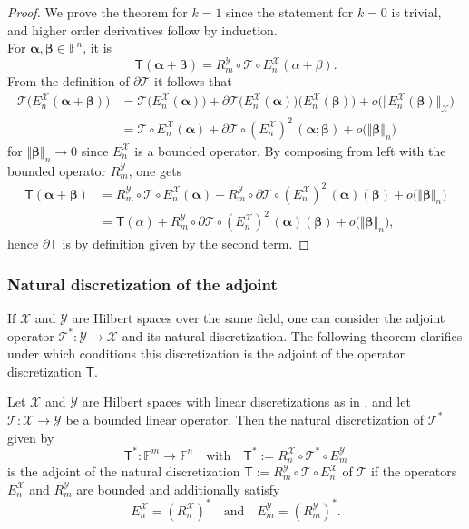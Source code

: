 \documentclass[a4paper]{paper}
\newcommand{\VecSpace}[1]{\mathscr{#1}}
\newcommand{\Field}{\mathbb{F}}
\newcommand{\Op}[1]{\mathcal{#1}}
\newcommand{\DiscOp}[1]{\mathsf{#1}}
\newcommand*{\EXT}[2]{\ensuremath{E_{#1}^{#2}}}
\newcommand*{\REST}[2]{\ensuremath{R_{#1}^{#2}}}
\newcommand*{\RnX}{\ensuremath{\REST{n}{\VecSpace{X}}}}
\newcommand*{\RmY}{\ensuremath{\REST{m}{\VecSpace{Y}}}}
\newcommand*{\EnX}{\ensuremath{\EXT{n}{\VecSpace{X}}}}
\newcommand*{\EmY}{\ensuremath{\EXT{m}{\VecSpace{Y}}}}
\newcommand{\valpha}{\boldsymbol{\alpha}}
\newcommand{\vbeta}{\boldsymbol{\beta}}
\begin{document}
\begin{proof}
 We prove the theorem for $k=1$ since the statement for $k=0$ is trivial, and higher order derivatives follow by induction.\\
 For $\valpha,\vbeta \in \Field^n$, it is
 \begin{equation*}
  \DiscOp{T}(\valpha + \vbeta) = \RmY \circ \Op{T} \circ \EnX (\alpha + \beta).
 \end{equation*}
 From the definition of $\partial \Op{T}$ it follows that
 \begin{align*}
  \Op{T}\big(\EnX(\valpha + \vbeta)\big)
  &= \Op{T}\big(\EnX(\valpha)\big) + \partial\Op{T}\big(\EnX(\valpha)\big)\big(\EnX(\vbeta)\big) +
  o\big(\big\Vert \EnX(\vbeta) \big\Vert_{\VecSpace{X}}\big) \\
  &= \Op{T} \circ \EnX(\valpha) + \partial\Op{T}\circ (\EnX)^2\,(\valpha; \vbeta) + o\big(\Vert \vbeta \Vert_n
  \big)
 \end{align*}
 for $\Vert \vbeta \Vert_n \to 0$ since $\EnX$ is a bounded operator. By composing from left with the bounded operator $\RmY$, one gets
 \begin{align*}
  \DiscOp{T}(\valpha + \vbeta)
  &= \RmY \circ \Op{T} \circ \EnX(\valpha) + \RmY \circ \partial\Op{T}\circ (\EnX)^2\,(\valpha)(\vbeta) + o\big(\Vert \vbeta \Vert_n \big) 
  \\
  &= \DiscOp{T}(\alpha) + \RmY \circ \partial\Op{T}\circ (\EnX)^2\,(\valpha)(\vbeta) + o\big(\Vert \vbeta \Vert_n \big),
 \end{align*}
 hence $\partial\DiscOp{T}$ is by definition given by the second term.
\end{proof}


\subsubsection{Natural discretization of the adjoint}

If $\VecSpace{X}$ and $\VecSpace{Y}$ are Hilbert spaces over the same field, one can consider the adjoint operator 
$\Op{T}^* \colon \VecSpace{Y} \to \VecSpace{X}$ and its natural discretization. The following theorem clarifies under which conditions this 
discretization is the adjoint of the operator discretization $\DiscOp{T}$.
%
\begin{lemma}
 Let $\VecSpace{X}$ and $\VecSpace{Y}$ are Hilbert spaces with linear discretizations as in , and let
 $\Op{T} \colon \VecSpace{X} \to \VecSpace{Y}$ be a bounded linear operator. Then the natural discretization of $\Op{T}^*$ given by
 \begin{equation*}
  \DiscOp{T}^* \colon \Field^m \to \Field^n
  \quad \text{with} \quad
  \DiscOp{T}^* := \RnX \circ \Op{T}^* \circ \EmY
 \end{equation*}
 is the adjoint of the natural discretization $\DiscOp{T} := \RmY \circ \Op{T} \circ \EnX$ of $\Op{T}$ if the operators $\EnX$ and $\RmY$ 
 are bounded and additionally satisfy
 \begin{equation*}
  \EnX = (\RnX)^* \quad \text{and} \quad \EmY = (\RmY)^*.
 \end{equation*}
\end{lemma}
\end{document}
